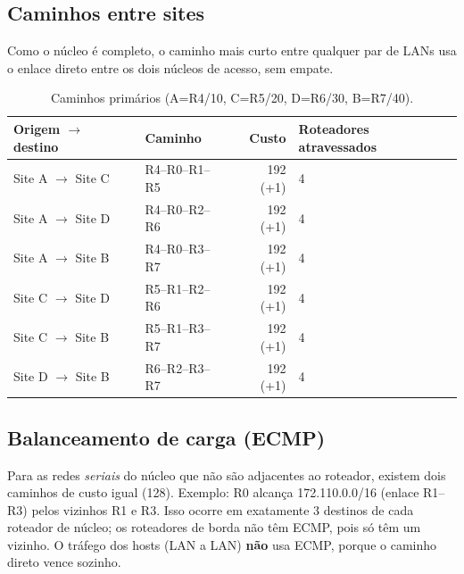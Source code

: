 \documentclass[12pt,a4paper]{article}
\begin{document}
\subsection{Caminhos entre sites}
Como o núcleo é completo, o caminho mais curto entre qualquer par de LANs usa o enlace direto entre os dois núcleos de acesso, sem empate.
\begin{table}[H]\centering\small
\begin{tabular}{@{}llrl@{}}\toprule
Origem $\to$ destino & Caminho & Custo & Roteadores atravessados\\\midrule
Site A $\to$ Site C & R4--R0--R1--R5 & 192 (+1) & 4\\
Site A $\to$ Site D & R4--R0--R2--R6 & 192 (+1) & 4\\
Site A $\to$ Site B & R4--R0--R3--R7 & 192 (+1) & 4\\
Site C $\to$ Site D & R5--R1--R2--R6 & 192 (+1) & 4\\
Site C $\to$ Site B & R5--R1--R3--R7 & 192 (+1) & 4\\
Site D $\to$ Site B & R6--R2--R3--R7 & 192 (+1) & 4\\\bottomrule
\end{tabular}
\caption{Caminhos primários (A=R4/10, C=R5/20, D=R6/30, B=R7/40).}
\end{table}

\subsection{Balanceamento de carga (ECMP)}
Para as redes \textit{seriais} do núcleo que não são adjacentes ao roteador, existem dois caminhos de custo igual (128). Exemplo: R0 alcança 172.110.0.0/16 (enlace R1--R3) pelos vizinhos R1 e R3. Isso ocorre em exatamente 3 destinos de cada roteador de núcleo; os roteadores de borda não têm ECMP, pois só têm um vizinho. O tráfego dos hosts (LAN a LAN) \textbf{não} usa ECMP, porque o caminho direto vence sozinho.
\end{document}
